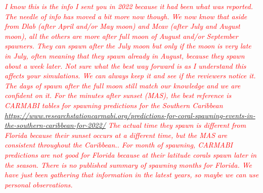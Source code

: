 \documentclass[preprint,12pt,authoryear]{elsarticle}
\newcommand{\emphc}[1]{\emph{\textcolor{red}{#1}}}
\begin{document}
\emphc{I know this is the info I sent you in 2022 because it had been what was reported. The needle of info has moved a bit more now though. We now know that aside from Dlab (after April and/or May moon) and Mcav (after July and August moon), all the others are more after full moon of August and/or September spawners. They can spawn after the July moon but only if the moon is very late in July, often meaning that they spawn already in August, because they spawn about a week later. Not sure what the best way forward is as I understand this affects your simulations. We can always keep it and see if the reviewers notice it. The days of spawn after the full moon still match our knowledge and we are confident on it. For the minutes after sunset (MAS), the best reference is  CARMABI tables for spawning predictions for the Southern Caribbean \url{https://www.researchstationcarmabi.org/predictions-for-coral-spawning-events-in-the-southern-caribbean-for-2022/} The actual time they spawn is different from Florida because their sunset occurs at a different time, but the MAS are consistent throughout the Caribbean.. For month of spawning, CARMABI predictions are not good for Florida because at their latitude corals spawn later in the season. There is no published summary of spawning months for Florida. We have just been gathering that information in the latest years, so maybe we can use personal observations.}
\end{document}
